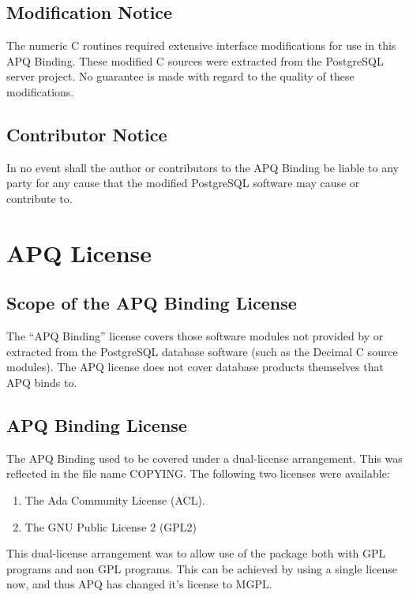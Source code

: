 \documentclass[english,letterpaper]{book}
\begin{document}
\section*{Modification Notice}

The numeric C routines required extensive interface modifications
for use in this APQ Binding. These modified C sources were extracted
from the PostgreSQL server project. No guarantee is made with regard
to the quality of these modifications.


\section*{Contributor Notice}

In no event shall the author or contributors to the APQ Binding be
liable to any party for any cause that the modified PostgreSQL software
may cause or contribute to.


\chapter{APQ License}
\label{license}


\section*{Scope of the APQ Binding License}

The {}``APQ Binding'' license covers those software modules not
provided by or extracted from the PostgreSQL database software (such
as the Decimal C source modules). The APQ license does not cover database
products themselves that APQ binds to.


\section*{APQ Binding License}

The APQ Binding used to be covered under a dual-license arrangement. This
was reflected in the file name COPYING. The following two licenses
were available:

\begin{enumerate}
   \item The Ada Community License (ACL).
   \item The GNU Public License 2 (GPL2)
\end{enumerate}

This dual-license arrangement was to allow use of the package both with GPL programs
and non GPL programs. This can be achieved by using a single license now, and thus APQ
has changed it's license to MGPL.
\end{document}
